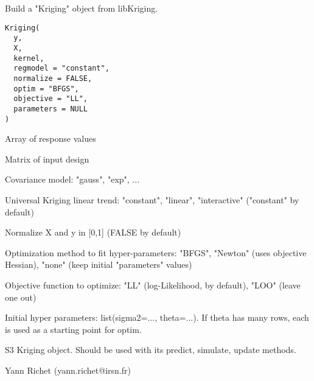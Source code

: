 \documentclass[letterpaper]{book}
\begin{document}
%
\begin{Description}\relax
Build a "Kriging" object from libKriging.
\end{Description}
%
\begin{Usage}
\begin{verbatim}
Kriging(
  y,
  X,
  kernel,
  regmodel = "constant",
  normalize = FALSE,
  optim = "BFGS",
  objective = "LL",
  parameters = NULL
)
\end{verbatim}
\end{Usage}
%
\begin{Arguments}
\begin{ldescription}
\item[\code{y}] Array of response values

\item[\code{X}] Matrix of input design

\item[\code{kernel}] Covariance model: "gauss", "exp", ...

\item[\code{regmodel}] Universal Kriging linear trend: "constant", "linear", "interactive" ("constant" by default)

\item[\code{normalize}] Normalize X and y in [0,1] (FALSE by default)

\item[\code{optim}] Optimization method to fit hyper-parameters: "BFGS", "Newton" (uses objective Hessian), "none" (keep initial "parameters" values)

\item[\code{objective}] Objective function to optimize: "LL" (log-Likelihood, by default), "LOO" (leave one out)

\item[\code{parameters}] Initial hyper parameters: list(sigma2=..., theta=...). If theta has many rows, each is used as a starting point for optim.
\end{ldescription}
\end{Arguments}
%
\begin{Value}
S3 Kriging object. Should be used with its predict, simulate, update methods.
\end{Value}
%
\begin{Author}\relax
Yann Richet (yann.richet@irsn.fr)
\end{Author}
\end{document}
